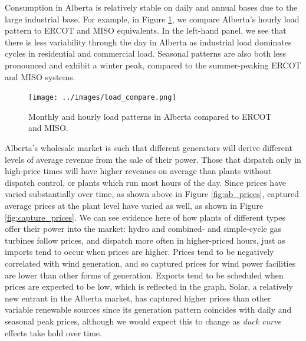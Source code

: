 \documentclass[12pt]{article}
\begin{document}
Consumption in Alberta is relatively stable on daily and annual bases due to the large industrial base. For example, in Figure \ref{fig:load_pattern}, we compare Alberta's hourly load pattern to ERCOT and MISO equivalents. In the left-hand panel, we see that there is less variability through the day in Alberta as industrial load dominates cycles in residential and commercial load. Seasonal patterns are also both less pronounced and exhibit a winter peak, compared to the summer-peaking ERCOT and MISO systems.

\begin{figure}[!h]%
	\centering \vspace{-.25cm} \texttt{[image: ../images/load\_compare.png]}
\vspace{-0.75cm}	\caption{Monthly and hourly load patterns in Alberta compared to ERCOT and MISO.}
\label{fig:load_pattern}
\end{figure}

Alberta's wholesale market is such that different generators will derive different levels of average revenue from the sale of their power. Those that dispatch only in high-price times will have higher revenues on average than plants without dispatch control, or plants which run most hours of the day. Since prices have varied substantially over time, as shown above in Figure \ref{fig:ab_prices}, captured average prices at the plant level have varied as well, as shown in Figure \ref{fig:capture_prices}. We can see evidence here of how plants of different types offer their power into the market: hydro and combined- and simple-cycle gas turbines follow prices, and dispatch more often in higher-priced hours, just as imports tend to occur when prices are higher. Prices tend to be negatively correlated with wind generation, and so captured prices for wind power facilities are lower than other forms of generation. Exports tend to be scheduled when prices are expected to be low, which is reflected in the graph. Solar, a relatively new entrant in the Alberta market, has captured higher prices than other variable renewable sources since its generation pattern coincides with daily and seasonal peak prices, although we would expect this to change as \emph{duck curve} effects take hold over time.
\end{document}
